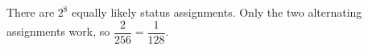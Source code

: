 There are $2^8$ equally likely status assignments. Only the two alternating assignments work, so $\boxed{\dfrac{2}{256}=\dfrac{1}{128}}$.
